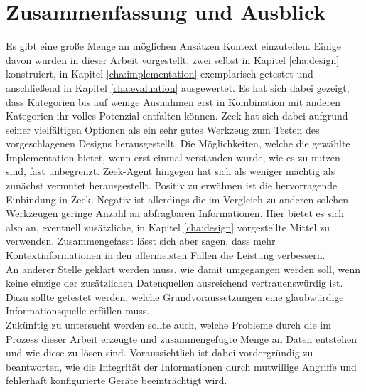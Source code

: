 \chapter{Zusammenfassung und Ausblick}%
\label{cha:conclusion}


Es gibt eine große Menge an möglichen Ansätzen Kontext einzuteilen. Einige davon wurden in dieser Arbeit vorgestellt, zwei selbst in Kapitel \ref{cha:design} konstruiert, in Kapitel \ref{cha:implementation} exemplarisch getestet und anschließend in Kapitel \ref{cha:evaluation} ausgewertet. Es hat sich dabei gezeigt, dass Kategorien bis auf wenige Ausnahmen erst in Kombination mit anderen Kategorien ihr volles Potenzial entfalten können. Zeek hat sich dabei aufgrund seiner vielfältigen Optionen als ein sehr gutes Werkzeug zum Testen des vorgeschlagenen Designs herausgestellt. Die Möglichkeiten, welche die gewählte Implementation bietet, wenn erst einmal verstanden wurde, wie es zu nutzen sind, fast unbegrenzt. Zeek-Agent hingegen hat sich als weniger mächtig als zunächst vermutet herausgestellt. Positiv zu erwähnen ist die hervorragende Einbindung in Zeek. Negativ ist allerdings die im Vergleich zu anderen solchen Werkzeugen geringe Anzahl an abfragbaren Informationen. Hier bietet es sich also an, eventuell zusätzliche, in Kapitel \ref{cha:design} vorgestellte Mittel zu verwenden. Zusammengefasst lässt sich aber sagen, dass mehr Kontextinformationen in den allermeisten Fällen die Leistung verbessern.\\
An anderer Stelle geklärt werden muss, wie damit umgegangen werden soll, wenn keine einzige der zusätzlichen Datenquellen ausreichend vertrauenswürdig ist. Dazu sollte getestet werden, welche Grundvoraussetzungen eine glaubwürdige Informationsquelle erfüllen muss.\\
Zukünftig zu untersucht werden sollte auch, welche Probleme durch die im Prozess dieser Arbeit erzeugte und zusammengefügte Menge an Daten entstehen und wie diese zu lösen sind. 
Voraussichtlich ist dabei vordergründig zu beantworten, wie die Integrität der Informationen durch mutwillige Angriffe und fehlerhaft konfigurierte Geräte beeinträchtigt wird.\\

